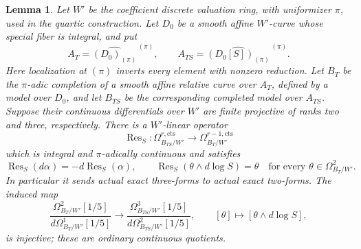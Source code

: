 \documentclass[11pt,a4paper]{amsart}
\numberwithin{equation}{section}
\newtheorem{lemma}[theorem]{Lemma}
\theoremstyle{definition}
\theoremstyle{remark}
\begin{document}
\begin{lemma}
\label{d2ext:dimtwoFullCohenLaurentResidue}
Let $W'$ be the coefficient discrete valuation ring, with
uniformizer $\pi$, used in the quartic construction.  Let $D_0$
be a smooth affine $W'$-curve whose special fiber is integral,
and put
\[
 A_T=\widehat{(D_0)_{(\pi)}}^{\,(\pi)},\qquad
 A_{TS}=\widehat{(D_0[S])_{(\pi)}}^{\,(\pi)}.
\]
Here localization at $(\pi)$ inverts every element with nonzero
reduction.  Let $B_T$ be the $\pi$-adic completion of a smooth
affine relative curve over $A_T$, defined by a model over $D_0$,
and let $B_{TS}$ be the corresponding completed model over
$A_{TS}$.  Suppose their continuous differentials over $W'$
are finite projective of ranks two and three, respectively.
There is a $W'$-linear operator
\[
 \operatorname{Res}_S:
 \Omega^{r,\mathrm{cts}}_{B_{TS}/W'}
       \longrightarrow \Omega^{r-1,\mathrm{cts}}_{B_T/W'}
\]
which is integral and $\pi$-adically continuous and satisfies
\[
 \operatorname{Res}_S(d\alpha)=-d\operatorname{Res}_S(\alpha),
 \qquad
 \operatorname{Res}_S(\theta\wedge d\log S)=\theta
       \quad\text{for every }\theta\in\Omega^2_{B_T/W'}.
\]
In particular it sends actual exact three-forms to actual exact
two-forms. The induced map
\[
 \frac{\Omega^2_{B_T/W'}[1/5]}
      {d\Omega^1_{B_T/W'}[1/5]}
 \longrightarrow
 \frac{\Omega^3_{B_{TS}/W'}[1/5]}
      {d\Omega^2_{B_{TS}/W'}[1/5]},
 \qquad [\theta]\longmapsto[\theta\wedge d\log S],
\]
is injective; these are ordinary continuous quotients.
\end{lemma}
\end{document}
